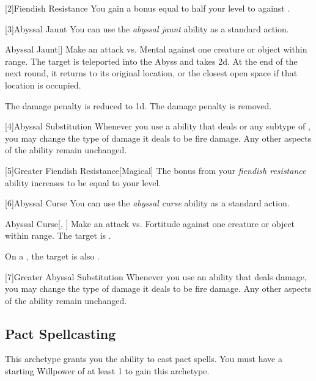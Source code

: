         [2]{Fiendish Resistance} You gain a bonus equal to half your level to  against .

        [3]{Abyssal Jaunt} You can use the \textit{abyssal jaunt} ability as a standard action.
        \begin{freeability}{Abyssal Jaunt}[]
            Make an attack vs. Mental against one creature or object within \rngclose range.
            \hit The target is teleported into the Abyss and takes  \minus2d.
            At the end of the next round, it returns to its original location, or the closest open space if that location is occupied.

            \rankline
             The damage penalty is reduced to \minus1d.
             The damage penalty is removed.
        \end{freeability}

        [4]{Abyssal Substitution} Whenever you use a  ability that deals  or any subtype of , you may change the type of damage it deals to be fire damage.
        Any other aspects of the ability remain unchanged.

        [5]{Greater Fiendish Resistance}[Magical] The bonus from your \textit{fiendish resistance} ability increases to be equal to your level.

        [6]{Abyssal Curse} You can use the \textit{abyssal curse} ability as a standard action.
        \begin{freeability}{Abyssal Curse}[, ]
            Make an attack vs. Fortitude against one creature or object within \rngclose range.
            \hit The target is .

            \rankline
             On a , the target is also .
        \end{freeability}

        [7]{Greater Abyssal Substitution} Whenever you use an ability that deals damage, you may change the type of damage it deals to be fire damage.
        Any other aspects of the ability remain unchanged.

    \subsection{Pact Spellcasting}
        This archetype grants you the ability to cast pact spells.
        You must have a starting Willpower of at least 1 to gain this archetype.

